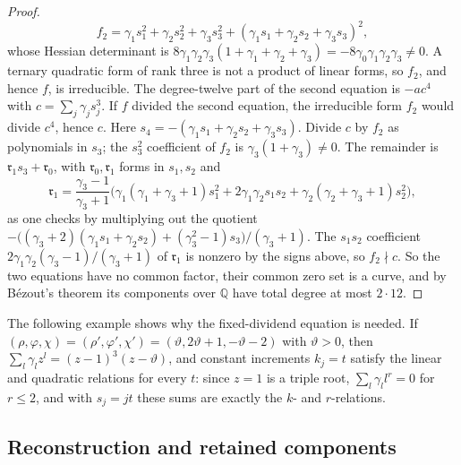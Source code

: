 \documentclass[11pt]{article}
\theoremstyle{definition}
\theoremstyle{remark}
\begin{document}
\begin{proof}
\[
 f_2=\gamma_1s_1^2+\gamma_2s_2^2+\gamma_3s_3^2+(\gamma_1s_1+\gamma_2s_2+\gamma_3s_3)^2,
\]
whose Hessian determinant is $8\gamma_1\gamma_2\gamma_3(1+\gamma_1+\gamma_2+\gamma_3)
=-8\gamma_0\gamma_1\gamma_2\gamma_3\ne0$. A ternary quadratic form of rank three is not a
product of linear forms, so $f_2$, and hence $f$, is irreducible. The degree-twelve part of
the second equation is $-ac^4$ with $c=\sum_j\gamma_js_j^3$. If $f$ divided the second
equation, the irreducible form $f_2$ would divide $c^4$, hence $c$. Here
$s_4=-(\gamma_1s_1+\gamma_2s_2+\gamma_3s_3)$. Divide $c$ by $f_2$ as
polynomials in $s_3$; the $s_3^2$ coefficient of $f_2$ is $\gamma_3(1+\gamma_3)\ne0$. The
remainder is $\mathfrak r_1s_3+\mathfrak r_0$, with $\mathfrak r_0,\mathfrak r_1$ forms in $s_1,s_2$ and
\[
 \mathfrak r_1=\frac{\gamma_3-1}{\gamma_3+1}\bigl(\gamma_1(\gamma_1+\gamma_3+1)s_1^2
 +2\gamma_1\gamma_2s_1s_2+\gamma_2(\gamma_2+\gamma_3+1)s_2^2\bigr),
\]
as one checks by multiplying out the quotient
$-\bigl((\gamma_3+2)(\gamma_1s_1+\gamma_2s_2)+(\gamma_3^2-1)s_3\bigr)/(\gamma_3+1)$.
The $s_1s_2$ coefficient $2\gamma_1\gamma_2(\gamma_3-1)/(\gamma_3+1)$ of $\mathfrak r_1$ is
nonzero by the signs above, so $f_2\nmid c$. So the two
equations have no common factor, their common zero set is a curve, and by B\'ezout's theorem
its components over $\mathbb Q$ have total degree at most $2\cdot12$.
\end{proof}

The following example shows why the fixed-dividend equation is needed. If $(\rho,\varphi,\chi)=(\rho',\varphi',\chi')=(\vartheta,2\vartheta+1,-\vartheta-2)$ with $\vartheta>0$, then
$\sum_l\gamma_lz^l=(z-1)^3(z-\vartheta)$, and constant increments $k_j=t$ satisfy the
linear and quadratic relations for every $t$: since $z=1$ is a triple root,
$\sum_l\gamma_ll^r=0$ for $r\le2$, and with $s_j=jt$ these sums are exactly the
$k$- and $r$-relations.


\subsection{Reconstruction and retained components}\label{sec:jointrecon}
\end{document}
